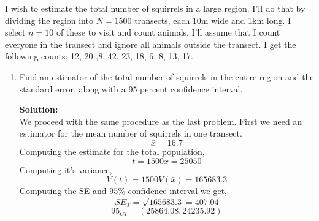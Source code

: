\documentclass[12pt]{article}
\makeatletter
\theoremstyle{homework}
\newenvironment{exercise}[1]
{\def\@currentlabel{#1}\exercisecore}
{\endexercisecore}
\newcommand{\localhead}[1]{\par\smallskip\noindent\textbf{#1}\nobreak\\}%
\newcommand\solution{\localhead{Solution:}}
\makeatother
\begin{document}
\begin{exercise}{5} I wish to estimate the total number of squirrels in a large region. I'll do that by 
    dividing the region into $N = 1500$ transects, each 10m wide and 1km long. I select $n = 10$ of these 
    to visit and count animals. I'll assume that I count everyone in the transect and ignore all animals 
    outside the transect. I get the following counts: 12, 20 ,8, 42, 23, 18, 6, 8, 13, 17.\\
    \begin{enumerate}
        \item Find an estimator of the total number of squirrels in the entire region and the standard error, along with a 95 percent confidence interval.\\
        \solution We proceed with the same procedure as the last problem. First we need an estimator for the mean number of squirrels in one transect. 
        \begin{equation*}
            \bar{x} = 16.7
        \end{equation*}
        Computing the estimate for the total population, 
        \begin{equation*}
            t = 1500\bar{x} = 25050
        \end{equation*}
        Computing it's variance, 
        \begin{equation*}
            V(t) = 1500V(\bar{x}) =  165683.3
        \end{equation*}
        Computing the SE and $95\%$ confidence interval we get, 
        \begin{equation*}
            SE_T = \sqrt{165683.3} = 407.04
        \end{equation*}
        \begin{equation*}
            95_{CI} = (25864.08, 24235.92)
        \end{equation*}
        \vspace{.15in}


\end{enumerate}
\end{exercise}
\end{document}
